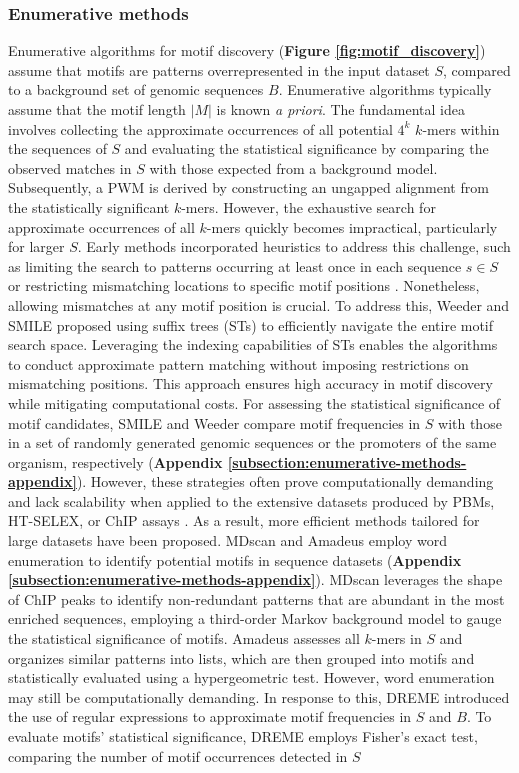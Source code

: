 \documentclass[a4paper, titlepage, openright]{book}
\begin{document}
\subsubsection{Enumerative methods}
Enumerative algorithms for motif discovery (\textbf{Figure \ref{fig:motif_discovery}}) assume that motifs are patterns overrepresented in the input dataset $S$, compared to a background set of genomic sequences
$B$⁠. Enumerative algorithms typically assume that the motif length $|M|$ is known \emph{a priori}. The fundamental idea involves collecting the approximate occurrences of all potential $4^{k}$ $k$-mers within the sequences of $S$ and evaluating the statistical significance by comparing the observed matches in $S$
with those expected from a background model. Subsequently, a PWM is derived by constructing an ungapped alignment from the statistically significant $k$-mers. However, the exhaustive search for approximate occurrences of all $k$-mers quickly becomes impractical, particularly for larger $S$. Early methods incorporated heuristics to address this challenge, such as limiting the search to patterns occurring at least once in each sequence $s \in S$ \citep{li1999finding} or restricting mismatching locations to specific motif positions \citep{califano2000splash}. Nonetheless, allowing mismatches at any motif position is crucial. To address this, Weeder \citep{pavesi2001algorithm,pavesi2004weeder} and SMILE \citep{marsan2000algorithms} proposed using suffix trees (STs) \citep{weiner1973linear} to efficiently navigate the entire motif search space. Leveraging the indexing capabilities of STs enables the algorithms to conduct approximate pattern matching without imposing restrictions on mismatching positions. This approach ensures high accuracy in motif discovery while mitigating computational costs. For assessing the statistical significance of motif candidates, SMILE and Weeder compare motif frequencies in $S$ with those in a set of randomly generated genomic sequences or the promoters of the same organism, respectively (\textbf{Appendix \ref{subsection:enumerative-methods-appendix}}). However, these strategies often prove computationally demanding and lack scalability when applied to the extensive datasets produced by PBMs, HT-SELEX, or ChIP assays \citep{liu2018algorithmic}. As a result, more efficient methods tailored for large datasets have been proposed. MDscan \citep{liu2002algorithm} and Amadeus \citep{linhart2008transcription} employ word enumeration to identify potential motifs in sequence datasets (\textbf{Appendix \ref{subsection:enumerative-methods-appendix}}). MDscan leverages the shape of ChIP peaks to identify non-redundant patterns that are abundant in the most enriched sequences, employing a third-order Markov background model to gauge the statistical significance of motifs. Amadeus assesses all $k$-mers in $S$ and organizes similar patterns into lists, which are then grouped into motifs and statistically evaluated using a hypergeometric test. However, word enumeration may still be computationally demanding. In response to this, DREME \citep{bailey2011dreme} introduced the use of regular expressions to approximate motif frequencies in $S$ and $B$⁠. To evaluate motifs' statistical significance, DREME employs Fisher’s exact test, comparing the number of motif occurrences detected in $S$
\end{document}
